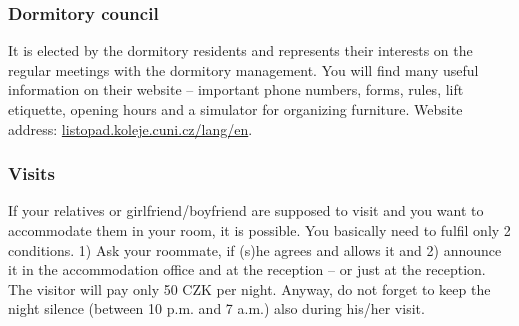 \subsubsection{Dormitory council}
It is elected by the dormitory residents and represents their interests on the
regular meetings with the dormitory management.
You will find many useful information on their website -- important phone
numbers, forms, rules, lift etiquette, opening hours and a simulator for
organizing furniture.
Website address: \url{listopad.koleje.cuni.cz/lang/en}.

\subsubsection{Visits}
If your relatives or girlfriend/boyfriend are supposed to visit and you want to
accommodate them in your room, it is possible. You basically need to fulfil only
2 conditions. 1) Ask your roommate, if (s)he agrees and allows it and 2)
announce it in the accommodation office and at the reception -- or just at the
reception. The visitor will pay only 50 CZK per night.
Anyway, do not forget to keep the night silence (between 10 p.m. and 7 a.m.)
also during his/her visit.